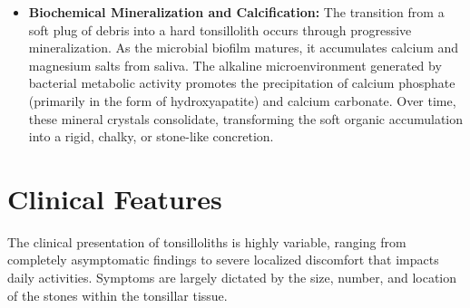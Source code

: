 \begin{itemize}
    \item \textbf{Biochemical Mineralization and Calcification:} The transition from a soft plug of debris into a hard tonsillolith occurs through progressive mineralization. As the microbial biofilm matures, it accumulates calcium and magnesium salts from saliva. The alkaline microenvironment generated by bacterial metabolic activity promotes the precipitation of calcium phosphate (primarily in the form of hydroxyapatite) and calcium carbonate. Over time, these mineral crystals consolidate, transforming the soft organic accumulation into a rigid, chalky, or stone-like concretion.
\end{itemize}

\section*{Clinical Features}
The clinical presentation of tonsilloliths is highly variable, ranging from completely asymptomatic findings to severe localized discomfort that impacts daily activities. Symptoms are largely dictated by the size, number, and location of the stones within the tonsillar tissue.
